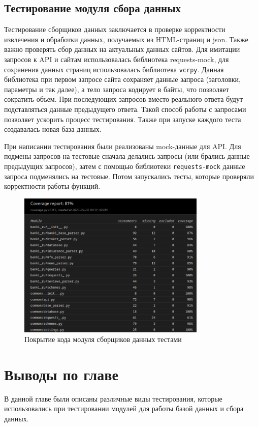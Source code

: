 \documentclass[PI, VKR]{HSEUniversity}
\begin{document}
\subsection{Тестирование модуля сбора данных}
\label{sec:org7cf65ac}
Тестирование сборщиков данных заключается в проверке корректности извлечения и обработки данных, получаемых из HTML-страниц и json. Также важно проверять сбор данных на актуальных данных сайтов. Для имитации запросов к API и сайтам использовалась библиотека requests-mock, для сохранения данных страниц использовалась библиотека \texttt{vcrpy}. Данная библиотека при первом запросе сайта сохраняет данные запроса (заголовки, параметры и так далее), а тело запроса кодирует в байты, что позволяет сократить объем. При последующих запросов вместо реального ответа будут подставляться данные предыдущего ответа. Такой способ работы с запросами позволяет ускорить процесс тестирования. Также при запуске каждого теста создавалась новая база данных.

При написании тестирования были реализованы mock-данные для API. Для подмены запросов на тестовые сначала делались запросы (или брались данные предыдущих запросов), затем с помощью библиотеки \texttt{requests-mock} данные запроса подменялись на тестовые. Потом запускались тесты, которые проверяли корректности работы функций.

\begin{figure}[h]
\centering
\includegraphics[width=0.8\textwidth]{img/parser_coverage.png}
\caption{\label{fig:parser_coverage}Покрытие кода модуля сборщиков данных тестами}
\end{figure}
\section{Выводы по главе}
\label{sec:orge0ac6c6}
В данной главе были описаны различные виды тестирования, которые использовались при тестировании модулей для работы базой данных и сбора данных.
\end{document}
